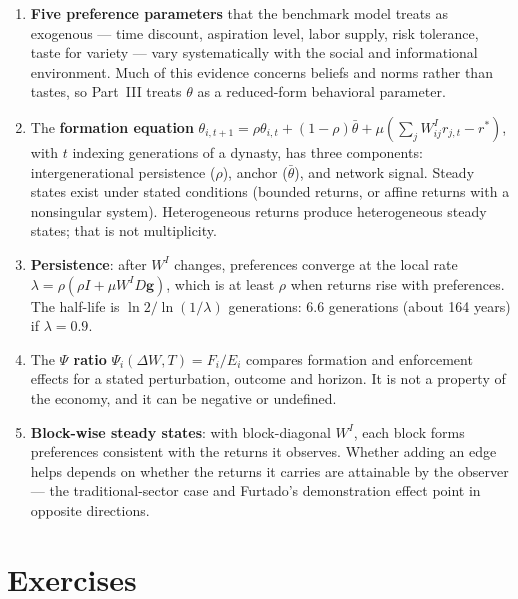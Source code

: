 \documentclass[../structural_economics_book.tex]{subfiles}
\begin{document}
\begin{enumerate}
\item \textbf{Five preference parameters} that the benchmark model treats as exogenous --- time discount, aspiration level, labor supply, risk tolerance, taste for variety --- vary systematically with the social and informational environment. Much of this evidence concerns beliefs and norms rather than tastes, so Part~III treats $\theta$ as a reduced-form behavioral parameter.

\item The \textbf{formation equation} $\theta_{i,t+1} = \rho\theta_{i,t} + (1-\rho)\bar{\theta} + \mu(\sum_j W^I_{ij} r_{j,t} - r^*)$, with $t$ indexing generations of a dynasty, has three components: intergenerational persistence ($\rho$), anchor ($\bar{\theta}$), and network signal. Steady states exist under stated conditions (bounded returns, or affine returns with a nonsingular system). Heterogeneous returns produce heterogeneous steady states; that is not multiplicity.

\item \textbf{Persistence}: after $W^I$ changes, preferences converge at the local rate $\lambda = \rho(\rho I + \mu W^I D\mathbf{g})$, which is at least $\rho$ when returns rise with preferences. The half-life is $\ln 2/\ln(1/\lambda)$ generations: 6.6 generations (about 164 years) if $\lambda = 0.9$.

\item The \textbf{$\Psi$ ratio} $\Psi_i(\Delta W, T) = F_i/E_i$ compares formation and enforcement effects for a stated perturbation, outcome and horizon. It is not a property of the economy, and it can be negative or undefined.

\item \textbf{Block-wise steady states}: with block-diagonal $W^I$, each block forms preferences consistent with the returns it observes. Whether adding an edge helps depends on whether the returns it carries are attainable by the observer --- the traditional-sector case and Furtado's demonstration effect point in opposite directions.
\end{enumerate}


\section{Exercises}
\label{ch09:sec:exercises}
\end{document}
